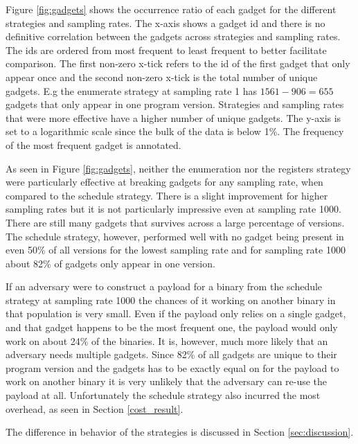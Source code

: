 Figure \ref{fig:gadgets} shows the occurrence ratio of each gadget for the different
strategies and sampling rates. The x-axis shows a gadget id and there is no definitive
correlation between the gadgets across strategies and sampling rates. The ids are ordered
from most frequent to least frequent to better facilitate comparison. The first non-zero
x-tick refers to the id of the first gadget that only appear once and the second non-zero
x-tick is the total number of unique gadgets. E.g the enumerate strategy at sampling rate
1 has $1561-906=655$ gadgets that only appear in one program version. Strategies and
sampling rates that were more effective have a higher number of unique gadgets. The y-axis
is set to a logarithmic scale since the bulk of the data is below 1\%. The frequency of
the most frequent gadget is annotated.

As seen in Figure \ref{fig:gadgets}, neither the enumeration nor the registers strategy
were particularly effective at breaking gadgets for any sampling rate, when compared to
the schedule strategy. There is a slight improvement for higher sampling rates but it is
not particularly impressive even at sampling rate 1000. There are still many gadgets that
survives across a large percentage of versions. The schedule strategy, however, performed
well with no gadget being present in even 50\% of all versions for the lowest sampling
rate and for sampling rate 1000 about 82\% of gadgets only appear in one version.

If an adversary were to construct a payload for a binary from the schedule strategy
at sampling rate 1000 the chances of it working on another binary in that population is
very small. Even if the payload only relies on a single gadget, and that gadget happens
to be the most frequent one, the payload would only work on about 24\% of the binaries. It
is, however, much more likely that an adversary needs multiple gadgets. Since 82\% of
all gadgets are unique to their program version and the gadgets has to be exactly equal on
for the payload to work on another binary it is very unlikely that the adversary can re-use
the payload at all. Unfortunately the schedule strategy also incurred the most overhead,
as seen in Section \ref{cost_result}.

The difference in behavior of the strategies is discussed in Section \ref{sec:discussion}.
